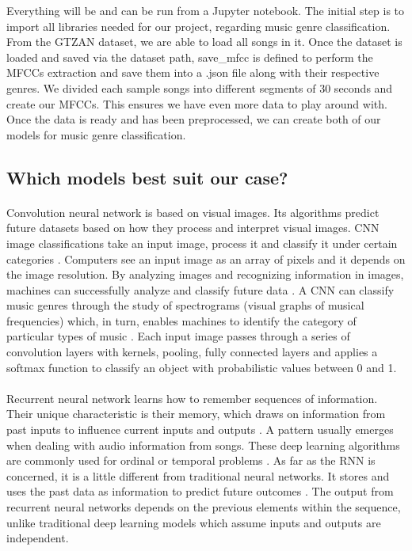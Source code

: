     Everything will be and can be run from a Jupyter notebook. The initial step is to import all libraries needed for our project, regarding music genre classification. From the GTZAN dataset, we are able to load all songs in it. Once the dataset is loaded and saved via the dataset path, save\_mfcc is defined to perform the MFCCs extraction and save them into a .json file along with their respective genres. We divided each sample songs into different segments of 30 seconds and create our MFCCs. This ensures we have even more data to play around with. Once the data is ready and has been preprocessed, we can create both of our models for music genre classification.\\
    
    \subsection{Which models best suit our case?}
        \paragraph{}
        Convolution neural network is based on visual images. Its algorithms predict future datasets based on how they process and interpret visual images. CNN image classifications take an input image, process it and classify it under certain categories \cite{cnn_rnn}. Computers see an input image as an array of pixels and it depends on the image resolution. By analyzing images and recognizing information in images, machines can successfully analyze and classify future data \cite{cnn_rnn_2}. A CNN can classify music genres through the study of spectrograms (visual graphs of musical frequencies) which, in turn, enables machines to identify the category of particular types of music \cite{cnn_rnn}. Each input image passes through a series of convolution layers with kernels, pooling, fully connected layers and applies a softmax function to classify an object with probabilistic values between 0 and 1. 

        \paragraph{}
        Recurrent neural network learns how to remember sequences of information. Their unique characteristic is their memory, which draws on information from past inputs to influence current inputs and outputs \cite{cnn_rnn}. A pattern usually emerges when dealing with audio information from songs. These deep learning algorithms are commonly used for ordinal or temporal problems \cite{cnn_rnn_2}. As far as the RNN is concerned, it is a little different from traditional neural networks. It stores and uses the past data as information to predict future outcomes \cite{cnn_rnn}. The output from recurrent neural networks depends on the previous elements within the sequence, unlike traditional deep learning models which assume inputs and outputs are independent.